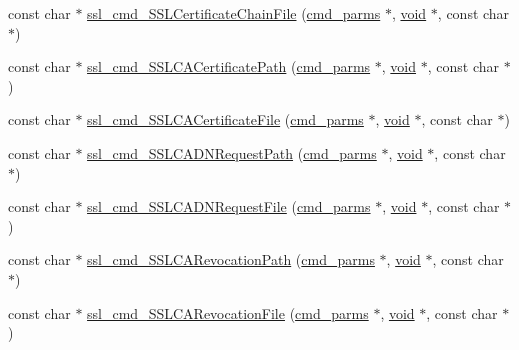 \begin{DoxyCompactItemize}
\item 
const char $\ast$ \hyperlink{group__MOD__SSL__PRIVATE_ga2541dcab4b3759445633b89a53cdccba}{ssl\+\_\+cmd\+\_\+\+S\+S\+L\+Certificate\+Chain\+File} (\hyperlink{group__APACHE__CORE__CONFIG_ga1791fbd28d06a9847bad001541c5241e}{cmd\+\_\+parms} $\ast$, \hyperlink{group__MOD__ISAPI_gacd6cdbf73df3d9eed42fa493d9b621a6}{void} $\ast$, const char $\ast$)
\item 
const char $\ast$ \hyperlink{group__MOD__SSL__PRIVATE_ga8b212a95fa9bbb551758cf3f81ff6db1}{ssl\+\_\+cmd\+\_\+\+S\+S\+L\+C\+A\+Certificate\+Path} (\hyperlink{group__APACHE__CORE__CONFIG_ga1791fbd28d06a9847bad001541c5241e}{cmd\+\_\+parms} $\ast$, \hyperlink{group__MOD__ISAPI_gacd6cdbf73df3d9eed42fa493d9b621a6}{void} $\ast$, const char $\ast$)
\item 
const char $\ast$ \hyperlink{group__MOD__SSL__PRIVATE_gaa65c886725a20a1b134618feef643380}{ssl\+\_\+cmd\+\_\+\+S\+S\+L\+C\+A\+Certificate\+File} (\hyperlink{group__APACHE__CORE__CONFIG_ga1791fbd28d06a9847bad001541c5241e}{cmd\+\_\+parms} $\ast$, \hyperlink{group__MOD__ISAPI_gacd6cdbf73df3d9eed42fa493d9b621a6}{void} $\ast$, const char $\ast$)
\item 
const char $\ast$ \hyperlink{group__MOD__SSL__PRIVATE_ga07f9e088d83acf48df3dc90d6c547d01}{ssl\+\_\+cmd\+\_\+\+S\+S\+L\+C\+A\+D\+N\+Request\+Path} (\hyperlink{group__APACHE__CORE__CONFIG_ga1791fbd28d06a9847bad001541c5241e}{cmd\+\_\+parms} $\ast$, \hyperlink{group__MOD__ISAPI_gacd6cdbf73df3d9eed42fa493d9b621a6}{void} $\ast$, const char $\ast$)
\item 
const char $\ast$ \hyperlink{group__MOD__SSL__PRIVATE_ga2edb1687f5897368f27e33a3a53a9df1}{ssl\+\_\+cmd\+\_\+\+S\+S\+L\+C\+A\+D\+N\+Request\+File} (\hyperlink{group__APACHE__CORE__CONFIG_ga1791fbd28d06a9847bad001541c5241e}{cmd\+\_\+parms} $\ast$, \hyperlink{group__MOD__ISAPI_gacd6cdbf73df3d9eed42fa493d9b621a6}{void} $\ast$, const char $\ast$)
\item 
const char $\ast$ \hyperlink{group__MOD__SSL__PRIVATE_ga18a4fde5bce7877b645f63729be6838d}{ssl\+\_\+cmd\+\_\+\+S\+S\+L\+C\+A\+Revocation\+Path} (\hyperlink{group__APACHE__CORE__CONFIG_ga1791fbd28d06a9847bad001541c5241e}{cmd\+\_\+parms} $\ast$, \hyperlink{group__MOD__ISAPI_gacd6cdbf73df3d9eed42fa493d9b621a6}{void} $\ast$, const char $\ast$)
\item 
const char $\ast$ \hyperlink{group__MOD__SSL__PRIVATE_ga424321dbcb8acf3752efeedbcba2e0d6}{ssl\+\_\+cmd\+\_\+\+S\+S\+L\+C\+A\+Revocation\+File} (\hyperlink{group__APACHE__CORE__CONFIG_ga1791fbd28d06a9847bad001541c5241e}{cmd\+\_\+parms} $\ast$, \hyperlink{group__MOD__ISAPI_gacd6cdbf73df3d9eed42fa493d9b621a6}{void} $\ast$, const char $\ast$)

\end{DoxyCompactItemize}
